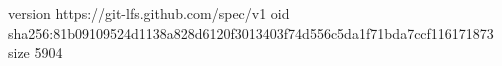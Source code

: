 version https://git-lfs.github.com/spec/v1
oid sha256:81b09109524d1138a828d6120f3013403f74d556c5da1f71bda7ccf116171873
size 5904
